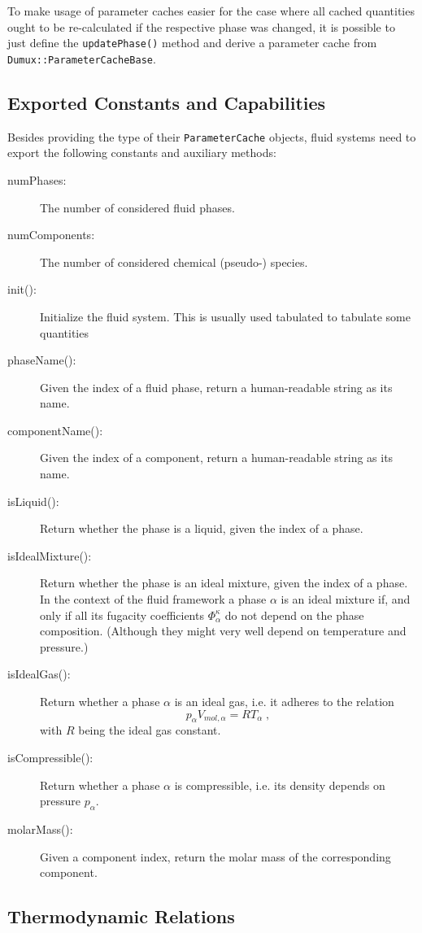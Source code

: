 To make usage of parameter caches easier for the case where all cached
quantities ought to be re-calculated if the respective phase was
changed, it is possible to just define the \texttt{updatePhase()}
method and derive a parameter cache from
\texttt{Dumux::ParameterCacheBase}.

\subsection{Exported Constants and Capabilities}

Besides providing the type of their \texttt{ParameterCache} objects,
fluid systems need to export the following constants and auxiliary
methods:
\begin{description}
\item[numPhases:] The number of considered fluid phases.
\item[numComponents:] The number of considered chemical (pseudo-) species.
\item[init():] Initialize the fluid system. This is usually
  used tabulated to tabulate some quantities
\item[phaseName():] Given the index of a fluid phase, return a
  human-readable string as its name.
\item[componentName():] Given the index of a component,
  return a human-readable string as its name.
\item[isLiquid():] Return whether the phase is a liquid, given the index of a phase.
\item[isIdealMixture():] Return whether the phase is an ideal
  mixture, given the index of a phase. In the context of the \Dumux
  fluid framework a phase $\alpha$ is an ideal mixture if, and only if
  all its fugacity coefficients $\Phi^\kappa_\alpha$ do not depend on
  the phase composition. (Although they might very well depend on
  temperature and pressure.)
\item[isIdealGas():] Return whether a phase $\alpha$ is an ideal
  gas, i.e. it adheres to the relation
  \[
  p_\alpha V_{mol,\alpha} = R T_\alpha \;,
  \]
  with $R$ being the ideal gas constant.
\item[isCompressible():] Return whether a phase $\alpha$ is
  compressible, i.e. its density depends on pressure $p_\alpha$.
\item[molarMass():] Given a component index, return the molar
  mass of the corresponding component.
\end{description}

\subsection{Thermodynamic Relations}

